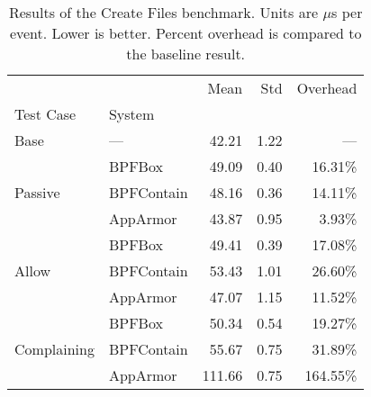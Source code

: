 \begin{table}[ht!]
\centering
\footnotesize
\caption[Results of the Create Files benchmark]{Results of the Create Files benchmark. Units are $\mu$s per event. Lower is better. Percent overhead is compared to the baseline result.}
\label{tab:phoronix-create-files}
\begin{tabular}{llrrr}
\toprule
            &          &    Mean &   Std &  Overhead \\
Test Case & System &         &       &           \\
\midrule
Base & --- &   42.21 &  1.22 &       --- \\
\cline{1-5}
\multirow{3}{*}{Passive} & BPFBox &   49.09 &  0.40 &   16.31\% \\
            & BPFContain &   48.16 &  0.36 &   14.11\% \\
            & AppArmor &   43.87 &  0.95 &    3.93\% \\
\cline{1-5}
\multirow{3}{*}{Allow} & BPFBox &   49.41 &  0.39 &   17.08\% \\
            & BPFContain &   53.43 &  1.01 &   26.60\% \\
            & AppArmor &   47.07 &  1.15 &   11.52\% \\
\cline{1-5}
\multirow{3}{*}{Complaining} & BPFBox &   50.34 &  0.54 &   19.27\% \\
            & BPFContain &   55.67 &  0.75 &   31.89\% \\
            & AppArmor &  111.66 &  0.75 &  164.55\% \\
\bottomrule
\end{tabular}
\end{table}
